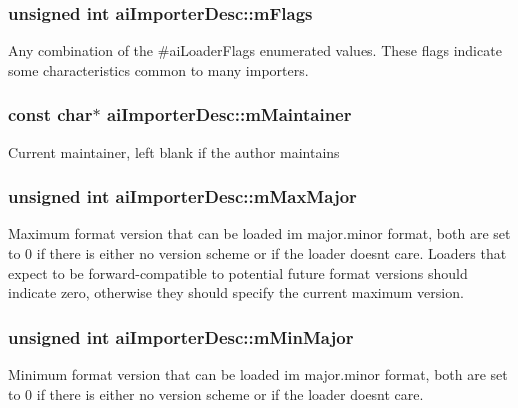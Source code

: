 \subsubsection[{\texorpdfstring{m\+Flags}{mFlags}}]{\setlength{\rightskip}{0pt plus 5cm}unsigned int ai\+Importer\+Desc\+::m\+Flags}\hypertarget{structai_importer_desc_a9939db58b9f95a537f9f5a749524b6b2}{}\label{structai_importer_desc_a9939db58b9f95a537f9f5a749524b6b2}
Any combination of the \#ai\+Loader\+Flags enumerated values. These flags indicate some characteristics common to many importers. 
\subsubsection[{\texorpdfstring{m\+Maintainer}{mMaintainer}}]{\setlength{\rightskip}{0pt plus 5cm}const char$\ast$ ai\+Importer\+Desc\+::m\+Maintainer}\hypertarget{structai_importer_desc_a53bf0ecb36ce0b97018b4b6bd2748f02}{}\label{structai_importer_desc_a53bf0ecb36ce0b97018b4b6bd2748f02}
Current maintainer, left blank if the author maintains 
\subsubsection[{\texorpdfstring{m\+Max\+Major}{mMaxMajor}}]{\setlength{\rightskip}{0pt plus 5cm}unsigned int ai\+Importer\+Desc\+::m\+Max\+Major}\hypertarget{structai_importer_desc_a9d33eac3be20f7f4630f838a228ada63}{}\label{structai_importer_desc_a9d33eac3be20f7f4630f838a228ada63}
Maximum format version that can be loaded im major.\+minor format, both are set to 0 if there is either no version scheme or if the loader doesn\textquotesingle{}t care. Loaders that expect to be forward-\/compatible to potential future format versions should indicate zero, otherwise they should specify the current maximum version. 
\subsubsection[{\texorpdfstring{m\+Min\+Major}{mMinMajor}}]{\setlength{\rightskip}{0pt plus 5cm}unsigned int ai\+Importer\+Desc\+::m\+Min\+Major}\hypertarget{structai_importer_desc_aee34d348f522807f0a36607664e92a57}{}\label{structai_importer_desc_aee34d348f522807f0a36607664e92a57}
Minimum format version that can be loaded im major.\+minor format, both are set to 0 if there is either no version scheme or if the loader doesn\textquotesingle{}t care. 
